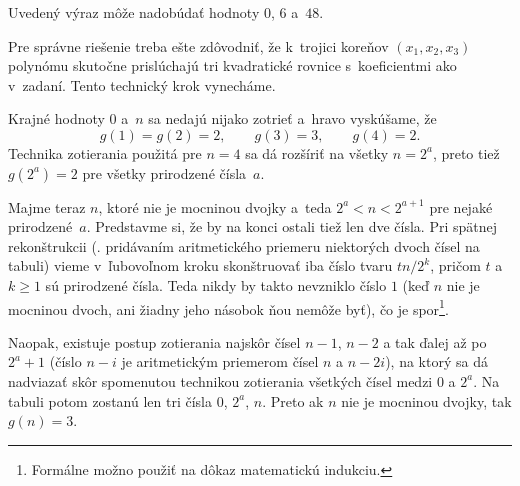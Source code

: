 {\odpoved
Uvedený výraz môže nadobúdať hodnoty $0$, $6$ a~$48$.

\poznamka
Pre správne riešenie treba ešte zdôvodniť, že k~trojici koreňov $(x_1,x_2,x_3)$ polynómu  skutočne prislúchajú tri kvadratické rovnice s~koeficientmi ako v~zadaní. Tento technický krok vynecháme.
}

{%
Krajné hodnoty $0$ a~$n$ sa nedajú nijako zotrieť a~hravo vyskúšame, že
$$
g(1)=g(2)=2,\qquad g(3)=3,\qquad g(4)=2.
$$
Technika zotierania použitá pre $n=4$ sa dá rozšíriť na všetky $n=2^a$, preto tiež $g(2^a)=2$ pre všetky prirodzené čísla~$a$.

Majme teraz $n$, ktoré nie je mocninou dvojky a~teda $2^a<n<2^{a+1}$ pre nejaké prirodzené~$a$. Predstavme si, že by na konci ostali tiež len dve čísla. Pri spätnej rekonštrukcii (\tj. pridávaním aritmetického priemeru niektorých dvoch čísel na tabuli) vieme v~ľubovoľnom kroku skonštruovať iba číslo tvaru $tn/2^k$, pričom $t$ a~$k\ge1$ sú prirodzené čísla. Teda nikdy by takto nevzniklo číslo $1$ (keď $n$ nie je mocninou dvoch, ani žiadny jeho násobok ňou nemôže byť), čo je spor\footnote{Formálne možno použiť na dôkaz matematickú indukciu.}.

Naopak, existuje postup zotierania najskôr čísel $n-1$, $n-2$ a tak ďalej až po $2^a+1$ (číslo $n-i$ je aritmetickým priemerom čísel $n$ a $n-2i$),
na ktorý sa dá nadviazať skôr spomenutou technikou zotierania všetkých čísel medzi $0$ a $2^a$. Na tabuli potom zostanú len tri čísla $0$, $2^a$, $n$.
Preto ak $n$ nie je mocninou dvojky, tak $g(n)=3$.
}

